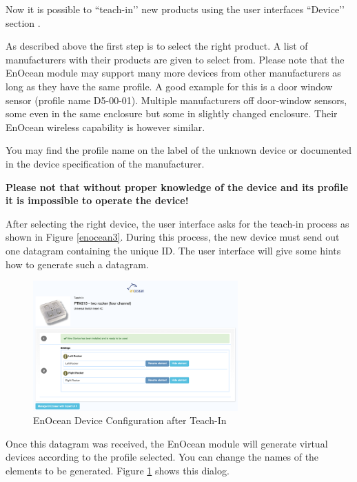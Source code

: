Now it is possible to ``teach-in’’ new products using the user interfaces ``Device’’ 
section .

As described above the first step is to select the right product. A list of manufacturers 
with their products are given to select from. Please note that the EnOcean module may 
support many more devices from other manufacturers as long as they have the same profile. 
A good example for this is a door window sensor (profile name D5-00-01). Multiple 
manufacturers off door-window sensors, some even in the same enclosure but some in 
slightly changed enclosure. Their EnOcean wireless capability is however similar.

You may find the profile name on the label of the unknown device or documented in the 
device specification of the manufacturer.

\textbf{Please not that without proper knowledge of the device and its profile it is 
impossible to operate the device!}

After selecting the right device, the user interface asks for the teach-in process 
as shown in Figure \ref{enocean3}. During this process, the new device must send 
out one datagram containing the unique ID. The user interface will give some 
hints how to generate such a datagram.

\begin{figure}
\begin{center}
\includegraphics[width=0.7\textwidth]{pngs/cap9/enocean4.png}
\caption{EnOcean Device Configuration after Teach-In}
\label{enocean4}
\end{center}
\end{figure}

Once this datagram was received, the EnOcean module will generate virtual devices 
according to the profile selected. You can change the names of the elements to be 
generated. Figure \ref{enocean4} shows this dialog.

